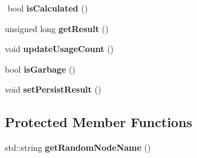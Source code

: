 \begin{DoxyCompactItemize}
$$\mbox{\label{classathena_1_1core_1_1_node_af75ed35cf7ec81f686292b1cef4c549d}} 
bool {\bfseries is\+Calculated} ()
\item 
\mbox{\label{classathena_1_1core_1_1_node_ae2568f40260ef891d79618c16d2fc1a8}} 
unsigned long {\bfseries get\+Result} ()
\item 
\mbox{\label{classathena_1_1core_1_1_node_ae160501f8419f9874bd71aefe6daa3dc}} 
void {\bfseries update\+Usage\+Count} ()
\item 
\mbox{\label{classathena_1_1core_1_1_node_ad0e6344fe6940e59d79eb4b05a7a5b96}} 
bool {\bfseries is\+Garbage} ()
\item 
\mbox{\label{classathena_1_1core_1_1_node_adf4b0a1427264f01de4e6d93e6349f18}} 
void {\bfseries set\+Persist\+Result} ()
\end{DoxyCompactItemize}
\subsection*{Protected Member Functions}
\begin{DoxyCompactItemize}
\item 
\mbox{\label{classathena_1_1core_1_1_node_aa2aee4b3d80299df55739295d8f7040a}} 
std\+::string {\bfseries get\+Random\+Node\+Name} ()
\end{DoxyCompactItemize}
